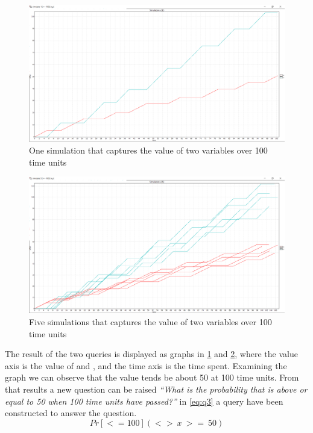\begin{figure}[!h]
	\includegraphics[width=\textwidth]{graphics/showcase01.png}
	\caption{One simulation that captures the value of two variables  over 100 time units}
	\label{fig:sim01}
\end{figure}

\begin{figure}[!h]
	\includegraphics[width=\textwidth]{graphics/showcase02.png}
	\caption{Five simulations that captures the value of two variables  over 100 time units}
	\label{fig:sim02}
\end{figure}

The result of the two queries is displayed as graphs in \cref{fig:sim01} and \cref{fig:sim02}, where the value axis is the value of  and , and the time axis is the time spent.
Examining the graph we can observe that the value  tends be about 50 at 100 time units.
From that results a new question can be raised \textit{``What is the probability that  is above or equal to 50 when 100 time units have passed?''} in \ref{eq:q3} a query have been constructed to answer the question.
\begin{equation}\label{eq:q3}
Pr[<=100](<>\ x\ >=\ 50)
\end{equation}

